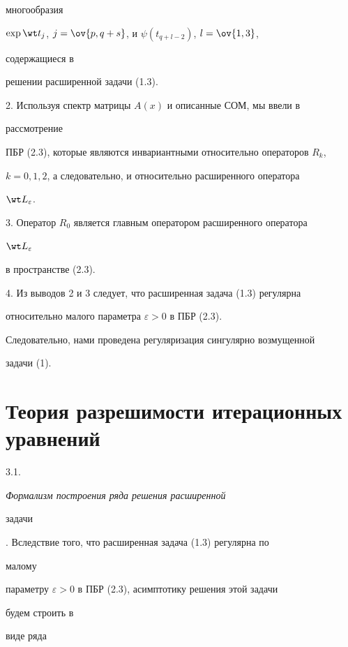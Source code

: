 многообразия 


$\exp\wt t_j$, $j=\ov{p,q+s}$, и $\psi(t_{q+l-2})$, $l=\ov{1,3}$, 


содержащиеся в 


решении расширенной задачи (1.3). 


 


2. Используя спектр матрицы $A(x)$ и описанные СОМ, мы ввели в 


рассмотрение 


ПБР (2.3), которые являются инвариантными относительно операторов $R_k$, 


$k=0,1,2$, а следовательно, и относительно расширенного оператора 


$\wt L_\varepsilon$. 


 


3. Оператор $R_0$ является главным оператором расширенного оператора 


$\wt L_\varepsilon$ 


в пространстве (2.3). 


 


4. Из выводов 2 и 3 следует, что расширенная задача (1.3) регулярна 


относительно малого параметра $\varepsilon>0$ в ПБР (2.3). 


 


Следовательно, нами проведена регуляризация сингулярно возмущенной 


задачи (1). 


 


\section{Теория разрешимости итерационных уравнений} 


 


3.1. {\it Формализм построения ряда решения расширенной 


задачи}. Вследствие того, что расширенная задача (1.3) регулярна по 


малому 


параметру $\varepsilon>0$ в ПБР (2.3), асимптотику решения этой задачи 


будем строить в 


виде ряда 


